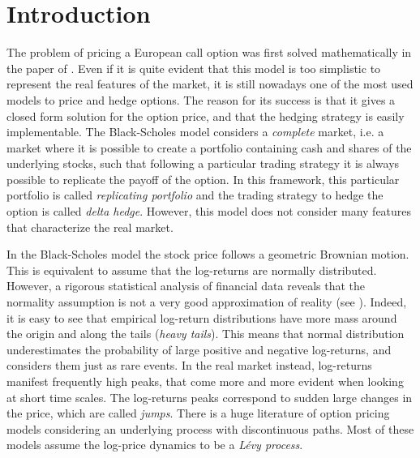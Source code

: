 

\chapter{Introduction}\label{Introd}
\minitoc%


\vspace{5em}

The problem of pricing a European call option was first solved mathematically in the paper of \cite{BS73}. 
Even if it is quite evident that this model is too simplistic to represent the real features of the market, it is 
still nowadays one of the most used models to price and hedge options.
The reason for its success is that it gives a closed form solution for the option price, and that the hedging strategy is easily 
implementable.
The Black-Scholes model considers a \emph{complete} market, i.e. a market where it is possible to create a portfolio containing cash 
and shares of the underlying stocks, such that following a particular trading strategy it is always possible to replicate
the payoff of the option. In this framework, this particular portfolio is called \emph{replicating portfolio} and
the trading strategy to hedge the option is called \emph{delta hedge}.
However, this model does not consider many features that characterize the real market. 

In the Black-Scholes model 
the stock price follows a geometric Brownian motion. This is equivalent to assume that the log-returns are 
normally distributed. 
However, a rigorous statistical analysis of financial data
reveals that the normality assumption is not a very good approximation of
reality (see \cite{Cont01}). Indeed, it is easy to see that empirical log-return distributions have
more mass around the origin and along the tails (\emph{heavy tails}).
This means that normal distribution underestimates the probability of large positive and negative
log-returns, and considers them just as rare events. In the real market instead,
log-returns manifest frequently high peaks, that come more and more evident
when looking at short time scales. The log-returns peaks correspond to sudden
large changes in the price, which are called \emph{jumps}. 
There is a huge literature of option pricing models considering an underlying process with discontinuous paths.
Most of these models assume the log-price dynamics to be a \emph{Lévy process}. 
 

